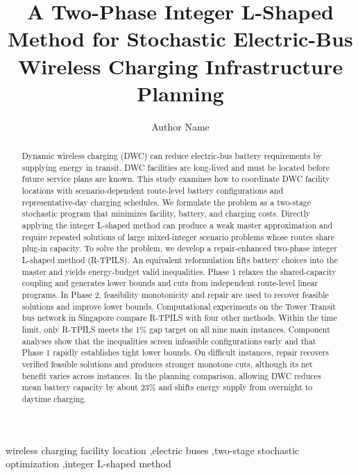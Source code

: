 \documentclass[final,3p,12pt,onecolumn,times,authoryear]{elsarticle}
\begin{document}
\begin{frontmatter}

\title{A Two-Phase Integer L-Shaped Method for Stochastic Electric-Bus Wireless Charging Infrastructure Planning}

\author[inst1]{Author Name}
\address[inst1]{Affiliation}

\begin{abstract}
Dynamic wireless charging (DWC) can reduce electric-bus battery requirements by supplying energy in transit.
DWC facilities are long-lived and must be located before future service plans are known.
This study examines how to coordinate DWC facility locations with scenario-dependent route-level battery configurations and representative-day charging schedules.
We formulate the problem as a two-stage stochastic program that minimizes facility, battery, and charging costs.
Directly applying the integer L-shaped method can produce a weak master approximation and require repeated solutions of large mixed-integer scenario problems whose routes share plug-in capacity.
To solve the problem, we develop a repair-enhanced two-phase integer L-shaped method (R-TPILS).
An equivalent reformulation lifts battery choices into the master and yields energy-budget valid inequalities.
Phase 1 relaxes the shared-capacity coupling and generates lower bounds and cuts from independent route-level linear programs.
In Phase 2, feasibility monotonicity and repair are used to recover feasible solutions and improve lower bounds.
Computational experiments on the Tower Transit bus network in Singapore compare R-TPILS with four other methods.
Within the time limit, only R-TPILS meets the 1\% gap target on all nine main instances.
Component analyses show that the inequalities screen infeasible configurations early and that Phase 1 rapidly establishes tight lower bounds.
On difficult instances, repair recovers verified feasible solutions and produces stronger monotone cuts, although its net benefit varies across instances.
In the planning comparison, allowing DWC reduces mean battery capacity by about 23\% and shifts energy supply from overnight to daytime charging.
\end{abstract}

\begin{keyword}
wireless charging facility location \sep electric buses \sep two-stage stochastic optimization \sep integer L-shaped method
\end{keyword}

\end{frontmatter}








\appendix


\FloatBarrier


\end{document}
